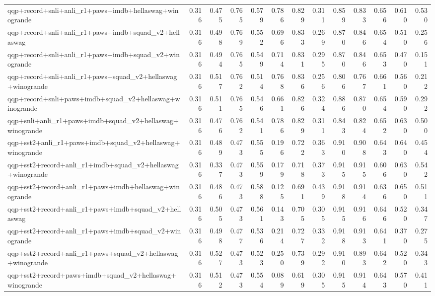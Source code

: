 \begin{table}[t]
\begin{tabular}{lrrrrrrrrrrrr}
    qqp+record+snli+anli\_r1+paws+imdb+hellaswag+winogrande & 0.316 & 0.475 & 0.765 & 0.579 & 0.786 & 0.829 & 0.311 & 0.859 & 0.833 & 0.656 & 0.610 & 0.530 \\
    qqp+record+snli+anli\_r1+paws+imdb+squad\_v2+hellaswag & 0.316 & 0.498 & 0.769 & 0.552 & 0.696 & 0.833 & 0.269 & 0.870 & 0.846 & 0.654 & 0.510 & 0.256 \\
    qqp+record+snli+anli\_r1+paws+imdb+squad\_v2+winogrande & 0.316 & 0.494 & 0.765 & 0.549 & 0.714 & 0.831 & 0.295 & 0.870 & 0.846 & 0.653 & 0.470 & 0.151 \\
    qqp+record+snli+anli\_r1+paws+squad\_v2+hellaswag+winogrande & 0.316 & 0.517 & 0.762 & 0.514 & 0.768 & 0.836 & 0.256 & 0.806 & 0.767 & 0.661 & 0.560 & 0.212 \\
    qqp+record+snli+paws+imdb+squad\_v2+hellaswag+winogrande & 0.316 & 0.511 & 0.765 & 0.546 & 0.661 & 0.826 & 0.324 & 0.886 & 0.870 & 0.654 & 0.590 & 0.292 \\
    qqp+snli+anli\_r1+paws+imdb+squad\_v2+hellaswag+winogrande & 0.316 & 0.476 & 0.762 & 0.541 & 0.786 & 0.829 & 0.311 & 0.843 & 0.824 & 0.652 & 0.630 & 0.500 \\
    qqp+sst2+anli\_r1+paws+imdb+squad\_v2+hellaswag+winogrande & 0.316 & 0.489 & 0.473 & 0.555 & 0.196 & 0.722 & 0.363 & 0.910 & 0.908 & 0.643 & 0.640 & 0.454 \\
    qqp+sst2+record+anli\_r1+imdb+squad\_v2+hellaswag+winogrande & 0.316 & 0.337 & 0.473 & 0.559 & 0.179 & 0.718 & 0.373 & 0.915 & 0.915 & 0.606 & 0.630 & 0.542 \\
    qqp+sst2+record+anli\_r1+paws+imdb+hellaswag+winogrande & 0.316 & 0.486 & 0.473 & 0.588 & 0.125 & 0.691 & 0.439 & 0.918 & 0.914 & 0.636 & 0.650 & 0.511 \\
    qqp+sst2+record+anli\_r1+paws+imdb+squad\_v2+hellaswag & 0.316 & 0.505 & 0.473 & 0.561 & 0.143 & 0.705 & 0.305 & 0.915 & 0.916 & 0.646 & 0.520 & 0.347 \\
    qqp+sst2+record+anli\_r1+paws+imdb+squad\_v2+winogrande & 0.316 & 0.498 & 0.477 & 0.536 & 0.214 & 0.727 & 0.332 & 0.918 & 0.913 & 0.641 & 0.370 & 0.275 \\
    qqp+sst2+record+anli\_r1+paws+squad\_v2+hellaswag+winogrande & 0.316 & 0.527 & 0.473 & 0.523 & 0.250 & 0.739 & 0.292 & 0.910 & 0.893 & 0.642 & 0.520 & 0.343 \\
    qqp+sst2+record+paws+imdb+squad\_v2+hellaswag+winogrande & 0.316 & 0.512 & 0.473 & 0.554 & 0.089 & 0.619 & 0.305 & 0.915 & 0.914 & 0.643 & 0.570 & 0.411 \\

\end{tabular}
\end{table}
